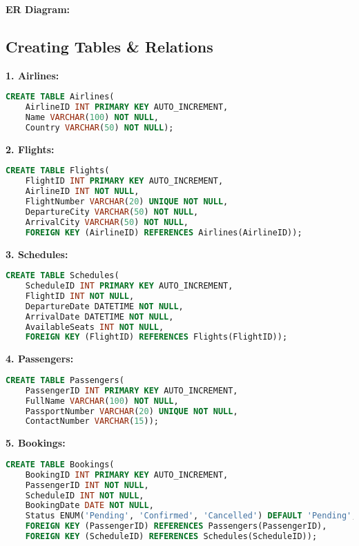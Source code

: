 \documentclass[14pt,a4paper]{extarticle}
\begin{document}
\newpage

\textbf{ER Diagram:}
\begin{center}
\end{center}

\newpage

\subsection{Creating Tables \& Relations}

\textbf{1. Airlines:}
\begin{lstlisting}[language=SQL, upquote=true]
CREATE TABLE Airlines(
    AirlineID INT PRIMARY KEY AUTO_INCREMENT,
    Name VARCHAR(100) NOT NULL,
    Country VARCHAR(50) NOT NULL);
\end{lstlisting}

\textbf{2. Flights:}
\begin{lstlisting}[language=SQL, upquote=true]
CREATE TABLE Flights(
    FlightID INT PRIMARY KEY AUTO_INCREMENT,
    AirlineID INT NOT NULL,
    FlightNumber VARCHAR(20) UNIQUE NOT NULL,
    DepartureCity VARCHAR(50) NOT NULL,
    ArrivalCity VARCHAR(50) NOT NULL,
    FOREIGN KEY (AirlineID) REFERENCES Airlines(AirlineID));
\end{lstlisting}

\textbf{3. Schedules:}
\begin{lstlisting}[language=SQL, upquote=true]
CREATE TABLE Schedules(
    ScheduleID INT PRIMARY KEY AUTO_INCREMENT,
    FlightID INT NOT NULL,
    DepartureDate DATETIME NOT NULL,
    ArrivalDate DATETIME NOT NULL,
    AvailableSeats INT NOT NULL,
    FOREIGN KEY (FlightID) REFERENCES Flights(FlightID));
\end{lstlisting}

\newpage

\textbf{4. Passengers:}
\begin{lstlisting}[language=SQL, upquote=true]
CREATE TABLE Passengers(
    PassengerID INT PRIMARY KEY AUTO_INCREMENT,
    FullName VARCHAR(100) NOT NULL,
    PassportNumber VARCHAR(20) UNIQUE NOT NULL,
    ContactNumber VARCHAR(15));
\end{lstlisting}

\textbf{5. Bookings:}
\begin{lstlisting}[language=SQL, upquote=true]
CREATE TABLE Bookings(
    BookingID INT PRIMARY KEY AUTO_INCREMENT,
    PassengerID INT NOT NULL,
    ScheduleID INT NOT NULL,
    BookingDate DATE NOT NULL,
    Status ENUM('Pending', 'Confirmed', 'Cancelled') DEFAULT 'Pending',
    FOREIGN KEY (PassengerID) REFERENCES Passengers(PassengerID),
    FOREIGN KEY (ScheduleID) REFERENCES Schedules(ScheduleID));
\end{lstlisting}
\end{document}
